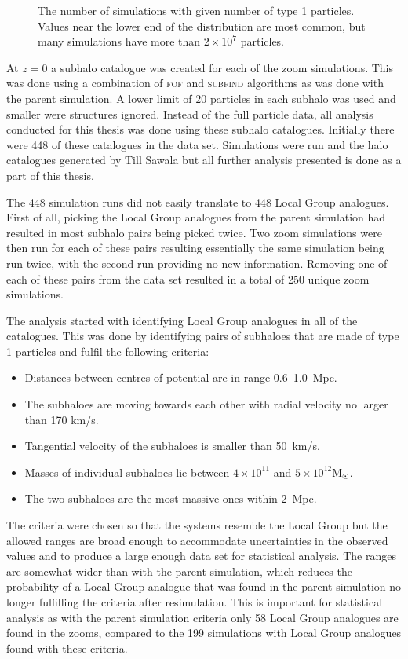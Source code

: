 \documentclass[english, twoside]{HYgradu}
\begin{document}
\begin{figure}
    \centering
    
    \caption{The number of simulations with given number of type 1 particles. Values near the lower end of the distribution are most common, but many simulations have more than $2 \times 10^7$ particles.}\label{fig:type1hist}
\end{figure}


At $z=0$ a subhalo catalogue was created for each of the zoom simulations. This was done using a combination of \textsc{fof} and \textsc{subfind} algorithms as was done with the parent simulation. A lower limit of 20 particles in each subhalo was used and smaller were structures ignored. Instead of the full particle data, all analysis conducted for this thesis was done using these subhalo catalogues. Initially there were 448 of these catalogues in the data set. Simulations were run and the halo catalogues generated by Till Sawala but all further analysis presented is done as a part of this thesis.

The 448 simulation runs did not easily translate to 448 Local Group analogues. First of all, picking the Local Group analogues from the parent simulation had resulted in most subhalo pairs being picked twice. Two zoom simulations were then run for each of these pairs resulting essentially the same simulation being run twice, with the second run providing no new information. Removing one of each of these pairs from the data set resulted in a total of 250 unique zoom simulations.

The analysis started with identifying Local Group analogues in all of the catalogues. This was done by identifying pairs of subhaloes that are made of type 1 particles and fulfil the following criteria:
\begin{itemize}
\item Distances between centres of potential are in range 0.6--1.0~Mpc.
\item The subhaloes are moving towards each other with radial velocity no larger than 170 km/s.
\item Tangential velocity of the subhaloes is smaller than 50~km/s.
\item Masses of individual subhaloes lie between $4 \times 10^{11}$ and $5 \times 10^{12} \mathrm{M_{\astrosun}}$.
\item The two subhaloes are the most massive ones within 2~Mpc.
\end{itemize}
The criteria were chosen so that the systems resemble the Local Group but the allowed ranges are broad enough to accommodate uncertainties in the observed values and to produce a large enough data set for statistical analysis. The ranges are somewhat wider than with the parent simulation, which reduces the probability of a Local Group analogue that was found in the parent simulation no longer fulfilling the criteria after resimulation. This is important for statistical analysis as with the parent simulation criteria only 58 Local Group analogues are found in the zooms, compared to the 199 simulations with Local Group analogues found with these criteria.
\end{document}

